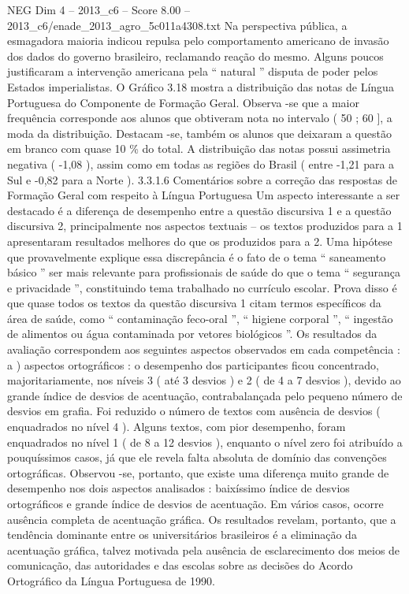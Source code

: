 \begin{textsample}{NEG Dim 4 – 2013\_c6 – Score 8.00 – 2013\_c6/enade\_2013\_agro\_5c011a4308.txt}
Na perspectiva pública, a esmagadora maioria indicou repulsa pelo comportamento americano de invasão dos dados do governo brasileiro, reclamando reação do mesmo.
Alguns poucos justificaram a intervenção americana pela “ natural ” disputa de poder pelos Estados imperialistas.
O Gráfico 3.18 mostra a distribuição das notas de Língua Portuguesa do Componente de Formação Geral.
Observa -se que a maior frequência corresponde aos alunos que obtiveram nota no intervalo ( 50 ; 60 ], a moda da distribuição.
Destacam -se, também os alunos que deixaram a questão em branco com quase 10 \% do total.
A distribuição das notas possui assimetria negativa ( -1,08 ), assim como em todas as regiões do Brasil ( entre -1,21 para a Sul e -0,82 para a Norte ). 3.3.1.6 Comentários sobre a correção das respostas de Formação Geral com respeito à Língua Portuguesa Um aspecto interessante a ser destacado é a diferença de desempenho entre a questão discursiva 1 e a questão discursiva 2, principalmente nos aspectos textuais – os textos produzidos para a 1 apresentaram resultados melhores do que os produzidos para a 2.
Uma hipótese que provavelmente explique essa discrepância é o fato de o tema “ saneamento básico ” ser mais relevante para profissionais de saúde do que o tema “ segurança e privacidade ”, constituindo tema trabalhado no currículo escolar.
Prova disso é que quase todos os textos da questão discursiva 1 citam termos específicos da área de saúde, como “ contaminação feco-oral ”, “ higiene corporal ”, “ ingestão de alimentos ou água contaminada por vetores biológicos ”.
Os resultados da avaliação correspondem aos seguintes aspectos observados em cada competência : a ) aspectos ortográficos : o desempenho dos participantes ficou concentrado, majoritariamente, nos níveis 3 ( até 3 desvios ) e 2 ( de 4 a 7 desvios ), devido ao grande índice de desvios de acentuação, contrabalançada pelo pequeno número de desvios em grafia.
Foi reduzido o número de textos com ausência de desvios ( enquadrados no nível 4 ).
Alguns textos, com pior desempenho, foram enquadrados no nível 1 ( de 8 a 12 desvios ), enquanto o nível zero foi atribuído a pouquíssimos casos, já que ele revela falta absoluta de domínio das convenções ortográficas.
Observou -se, portanto, que existe uma diferença muito grande de desempenho nos dois aspectos analisados : baixíssimo índice de desvios ortográficos e grande índice de desvios de acentuação.
Em vários casos, ocorre ausência completa de acentuação gráfica.
Os resultados revelam, portanto, que a tendência dominante entre os universitários brasileiros é a eliminação da acentuação gráfica, talvez motivada pela ausência de esclarecimento dos meios de comunicação, das autoridades e das escolas sobre as decisões do Acordo Ortográfico da Língua Portuguesa de 1990.

\end{textsample}
